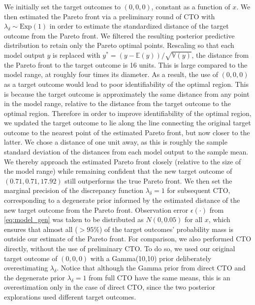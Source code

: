 \documentclass[12pt]{article}
\begin{document}
We initially set the target outcomes to $(0,0,0)$, constant as a function of $x$. 
%
We then estimated the Pareto front via a preliminary round of CTO with $\lambda_\delta\sim \mathrm{Exp}(1)$ in order to estimate the standardized distance of the target outcome from the Pareto front.
%
We filtered the resulting posterior predictive distribution to retain only the Pareto optimal points.
%
Rescaling so that each model output $y$ is replaced with $y^*=(y-\mathbb E(y))/\sqrt{\mathbb V(y)}$, the distance from the Pareto front to the target outcome is 16 units.
%
This is large compared to the model range, at roughly four times its diameter.
%
As a result, the use of $(0,0,0)$ as a target outcome would lead to poor identifiability of the optimal region. 
%
This is because the target outcome is approximately the same distance from any point in the model range, relative to the distance from the target outcome to the optimal region.
%
Therefore in order to improve identifiability of the optimal region, we updated the target outcome to lie along the line connecting the original target outcome to the nearest point of the estimated Pareto front, but now closer to the latter.
%
We chose a distance of one unit away, as this is roughly the sample standard deviation of the distances from each model output to the sample mean.
%
We thereby approach the estimated Pareto front closely (relative to the size of the model range) while remaining confident that the new target outcome of $(0.71, 0.71, 17.92)$ still outperforms the true Pareto front.
%
We then set the marginal precision of the discrepancy function $\lambda_\delta=1$ for subsequent CTO, corresponding to a degenerate prior informed by the estimated distance of the new target outcome from the Pareto front.
%
Observation error $\epsilon(\cdot)$ from \eqref{eq:model_gen} was taken to be distributed as $N(0,0.05)$ for all $x$, which ensures that almost all ($>95\%$) of the target outcomes' probability mass is outside our estimate of the Pareto front.
%
For comparison, we also performed CTO directly, without the use of preliminary CTO.
%
To do so, we used our original target outcome of $(0,0,0)$ with a Gamma(10,10) prior deliberately overestimating $\lambda_\delta$.
%
Notice that although the Gamma prior from direct CTO and the degenerate prior $\lambda_\delta=1$ from full CTO have the same means, this is an overestimation only in the case of direct CTO, since the two posterior explorations used different target outcomes.
%
\end{document}
